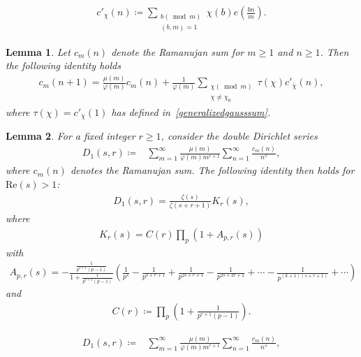 \documentclass[10pt,a4paper]{amsart}
\newtheorem{lemma}{Lemma}
\begin{document}
\begin{align}\label{generalizedgausssum}
c'_{\chi}(n) 
\coloneqq \sum_{\substack{b(\bmod{m})\\(b,m)=1}}\chi(b)e\left(\frac{bn}{m}\right).
\end{align}

\begin{lemma}\label{shiftedramanujansumformula}
Let $c_m(n)$ denote the Ramanujan sum for $m\geq 1$ and $n\geq 1$. Then the following identity holds
\begin{align*}
c_m(n+1)
=\frac{\mu(m)}{\varphi(m)}c_m(n)+\frac{1}{\varphi(m)}\sum_{\substack{\chi(\bmod{m})\\ \chi\ne\chi_0}}\tau(\chi)c'_{\bar{\chi}}(n),
\end{align*}
where $\tau(\chi)=c'_{\chi}(1)$ has defined in~\eqref{generalizedgausssum}. %
\end{lemma}

\begin{lemma}\label{dsklemma}
For a fixed integer $r\geq 1$, consider the double Dirichlet series
\begin{align}\label{dskdefinition}
D_1(s,r)
\coloneqq &\sum_{m=1}^{\infty}\frac{\mu(m)}{\varphi(m)m^{r+1}}\sum_{n=1}^{\infty}\frac{c_m(n)}{n^s},
\end{align}
where $c_m(n)$ denotes the Ramanujan sum. The following identity then holds for $\mathrm{Re}(s)>1$:
\begin{align*}
D_1(s,r)
=\frac{\zeta(s)}{\zeta(s+r+1)}K_r(s),
\end{align*}
where
\begin{align}\label{arsdefinition}
K_r(s)
=C(r)\prod_{p}\left(1+A_{p,r}(s)\right)
\end{align}
with 
\begin{align*}%
A_{p,r}(s)
=-\frac{\frac{1}{p^{r+1}(p-1)}}{1+\frac{1}{p^{r+1}(p-1)}}\left(\frac{1}{p^s}-\frac{1}{p^{s+r+1}}+\frac{1}{p^{2s+r+1}}-\frac{1}{p^{2s+2r+2}}+\cdots-\frac{1}{p^{(k+1)(s+r+1)}}+\cdots\right)
\end{align*}
and
\begin{align}\label{crdefinition}
C(r)
\coloneqq\prod_{p}\left(1+\frac{1}{p^{r+1}(p-1)}\right).    
\end{align}
\end{lemma}    

\begin{align}
D_1(s,r)
\coloneqq &\sum_{m=1}^{\infty}\frac{\mu(m)}{\varphi(m)m^{r+1}}\sum_{n=1}^{\infty}\frac{c_m(n)}{n^s},
\end{align}
\end{document}
